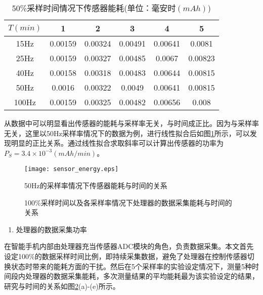 \begin{table}[htb]
    \centering
    \caption{50\%采样时间情况下传感器能耗(单位：毫安时$(mAh)$)}\label{50_energy}
    \begin{tabular}{cccccc}
    \toprule
     $T(min)$ & 1 & 2 & 3 & 4 & 5 \\
    \midrule
    15Hz & 0.00159 & 0.00324 & 0.00491 & 0.00641 & 0.0081 \\
    25Hz & 0.00159 & 0.00327 & 0.00485 & 0.0067 & 0.00823 \\
    40Hz & 0.00158 & 0.00318 & 0.00483 & 0.00644 & 0.00815 \\
    50Hz & 0.0016 & 0.00322 & 0.0049 & 0.00641 & 0.00815 \\
    100Hz & 0.00159 & 0.00325 & 0.00482 & 0.00656 & 0.008 \\
    \bottomrule
    \end{tabular}
 \end{table}


\par 从数据中可以明显看出传感器的能耗与采样率无关，与时间成正比。因为与采样率无关，这里以50Hz采样率情况下的数据为例，进行线性拟合后如图\ref{sensor_energy}所示，可以发现明显的正比关系。通过线性拟合求取斜率可以计算出传感器的功率为$P_S = 3.4 \times 10^{-3} (mAh/min)$。

\begin{figure}[htb]
\centering
\texttt{[image: sensor\_energy.eps]}
\caption{50Hz的采样率情况下传感器能耗与时间的关系}\label{sensor_energy}
\end{figure}

\begin{figure}[!htb]
    \centering
    \caption{100\%采样时间以及各采样率情况下处理器的数据采集能耗与时间的关系}\label{sample}
\end{figure}

\begin{enumerate}[(2)]
	\item 处理器的数据采集功率
\end{enumerate}
\par 在智能手机内部由处理器充当传感器ADC模块的角色，负责数据采集。本文首先设定100\%的数据采样时间比例，即持续采集数据，避免了处理器在控制传感器切换状态时带来的能耗方面的干扰。然后在5个采样率的实验设定情况下，测量5种时间段内处理器的数据采集能耗，多次测量结果的平均能耗最为该实验设定的结果，研究与时间的关系如图\ref{sample}(a)-(e)所示。


